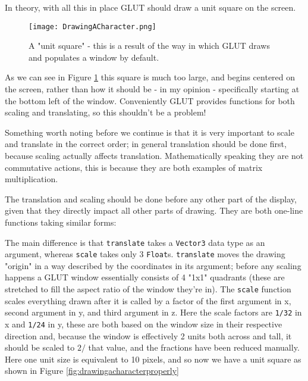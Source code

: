 \documentclass[12pt, a4paper]{report}
\begin{document}
\par

In theory, with all this in place GLUT should draw a unit square on the screen.

\begin{figure}[ht]
  \centering
  \caption{A "unit square" - this is a result of the way in which GLUT draws and populates a window by default.}
  \texttt{[image: DrawingACharacter.png]}
  \label{fig:drawingacharacter}
\end{figure}

As we can see in Figure \ref{fig:drawingacharacter} this square is much too large, and begins centered on the screen, rather than how it should be - in my opinion - specifically starting at the bottom left of the window.
Conveniently GLUT provides functions for both scaling and translating, so this shouldn't be a problem!

\par

Something worth noting before we continue is that it is very important to scale and translate in the correct order; in general translation should be done first, because scaling actually affects translation.
Mathematically speaking they are not commutative actions, this is because they are both examples of matrix multiplication.

\par

The translation and scaling should be done before any other part of the display, given that they directly impact all other parts of drawing.
They are both one-line functions taking similar forms:

The main difference is that \verb|translate| takes a \verb|Vector3| data type as an argument, whereas \verb|scale| takes only 3 \verb|Float|s.
\verb|translate| moves the drawing "origin" in a way described by the coordinates in its argument; before any scaling happens a GLUT window essentially consists of 4 "1x1" quadrants (these are stretched to fill the aspect ratio of the window they're in).
The \verb|scale| function scales everything drawn after it is called by a factor of the first argument in x, second argument in y, and third argument in z.
Here the scale factors are \verb|1/32| in x and \verb|1/24| in y, these are both based on the window size in their respective direction and, because the window is effectively 2 units both across and tall, it should be scaled to $2/$ that value, and the fractions have been reduced manually.
Here one unit size is equivalent to 10 pixels, and so now we have a unit square as shown in Figure \ref{fig:drawingacharacterproperly}
\end{document}
